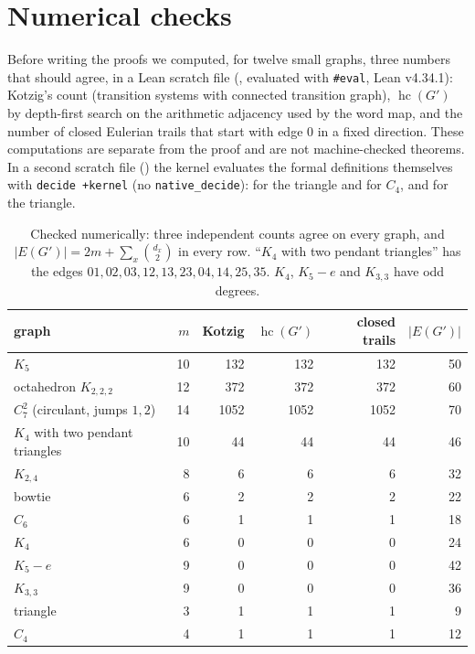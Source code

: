 \documentclass[10pt]{amsart}
\theoremstyle{plain}
\theoremstyle{definition}
\theoremstyle{remark}
\numberwithin{equation}{section}
\newcommand{\HC}{\operatorname{hc}}
\begin{document}
\section{Numerical checks}\label{sec:numerics}

Before writing the proofs we computed, for twelve small graphs, three numbers that should agree, in a
Lean scratch file (, evaluated with \texttt{\#eval},
Lean v4.34.1): Kotzig's count (transition systems with connected transition graph), $\HC(G')$ by
depth-first search on the arithmetic adjacency used by the word map, and the number of closed
Eulerian trails that start with edge $0$ in a fixed direction. These computations are separate from the
proof and are not machine-checked theorems. In a second scratch file () the kernel
evaluates the formal definitions themselves with \texttt{decide +kernel} (no \texttt{native\_decide}):
 for the triangle and for $C_4$, and
 for the triangle.

\begin{table}[ht]
\centering\small
\begin{tabular}{@{}lrrrrr@{}}
\toprule
graph & $m$ & Kotzig & $\HC(G')$ & closed trails & $|E(G')|$\\
\midrule
$K_5$ & 10 & 132 & 132 & 132 & 50\\
octahedron $K_{2,2,2}$ & 12 & 372 & 372 & 372 & 60\\
$C_7^2$ (circulant, jumps $1,2$) & 14 & 1052 & 1052 & 1052 & 70\\
$K_4$ with two pendant triangles & 10 & 44 & 44 & 44 & 46\\
$K_{2,4}$ & 8 & 6 & 6 & 6 & 32\\
bowtie & 6 & 2 & 2 & 2 & 22\\
$C_6$ & 6 & 1 & 1 & 1 & 18\\
$K_4$ & 6 & 0 & 0 & 0 & 24\\
$K_5-e$ & 9 & 0 & 0 & 0 & 42\\
$K_{3,3}$ & 9 & 0 & 0 & 0 & 36\\
triangle & 3 & 1 & 1 & 1 & 9\\
$C_4$ & 4 & 1 & 1 & 1 & 12\\
\bottomrule
\end{tabular}
\caption{Checked numerically: three independent counts agree on every graph, and
$|E(G')|=2m+\sum_x\binom{d_x}{2}$ in every row. ``$K_4$ with two pendant triangles'' has the edges
$01,02,03,12,13,23,04,14,25,35$. $K_4$, $K_5-e$ and $K_{3,3}$ have odd degrees.}\label{tab:numerics}
\end{table}
\end{document}
